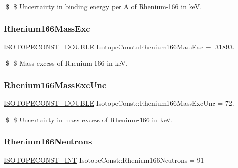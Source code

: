 \$ \$ Uncertainty in binding energy per A of Rhenium-\/166 in keV. \mbox{\label{group___isotope_const-_rhenium-_re166_ga2cccf1b56a20f0f23be2f87fcc483158}} 
\subsubsection{\texorpdfstring{Rhenium166\+Mass\+Exc}{Rhenium166MassExc}}
{\footnotesize\ttfamily \mbox{\hyperlink{group___isotope_const-_macros_ga8f45a7272ce02c0b4c65c44636ed719a}{I\+S\+O\+T\+O\+P\+E\+C\+O\+N\+S\+T\+\_\+\+D\+O\+U\+B\+LE}} Isotope\+Const\+::\+Rhenium166\+Mass\+Exc = -\/31893.}

\$ \$ Mass excess of Rhenium-\/166 in keV. \mbox{\label{group___isotope_const-_rhenium-_re166_ga00f8061934ac4639b6a5b4bd14cb617a}} 
\subsubsection{\texorpdfstring{Rhenium166\+Mass\+Exc\+Unc}{Rhenium166MassExcUnc}}
{\footnotesize\ttfamily \mbox{\hyperlink{group___isotope_const-_macros_ga8f45a7272ce02c0b4c65c44636ed719a}{I\+S\+O\+T\+O\+P\+E\+C\+O\+N\+S\+T\+\_\+\+D\+O\+U\+B\+LE}} Isotope\+Const\+::\+Rhenium166\+Mass\+Exc\+Unc = 72.}

\$ \$ Uncertainty in mass excess of Rhenium-\/166 in keV. \mbox{\label{group___isotope_const-_rhenium-_re166_ga263e14aa7a395fdb9a0306ca141ee40f}} 
\subsubsection{\texorpdfstring{Rhenium166\+Neutrons}{Rhenium166Neutrons}}
{\footnotesize\ttfamily \mbox{\hyperlink{group___isotope_const-_macros_ga5f18360b3e99483a35c32d789e62621c}{I\+S\+O\+T\+O\+P\+E\+C\+O\+N\+S\+T\+\_\+\+I\+NT}} Isotope\+Const\+::\+Rhenium166\+Neutrons = 91}

